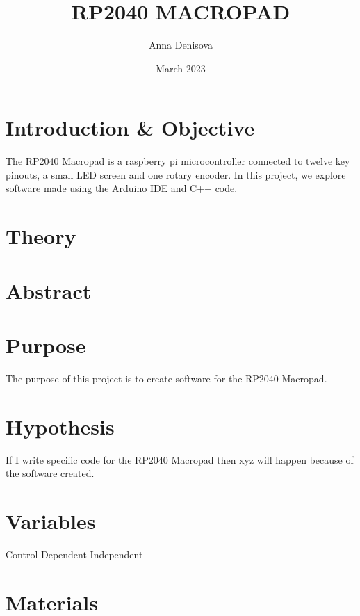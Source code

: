 \documentclass{article}
\title{RP2040 MACROPAD}
\author{Anna Denisova}
\date{March 2023}
\begin{document}
\maketitle
\tableofcontents

\newpage

\section{Introduction \& Objective}

The RP2040 Macropad is a raspberry pi microcontroller connected to twelve key pinouts, a small LED screen and one rotary encoder. In this project, we explore software made using the Arduino IDE and C++ code. 

\section{Theory}

\section{Abstract}

\section{Purpose}

The purpose of this project is to create software for the RP2040 Macropad.

\section{Hypothesis}

If I write specific code for the RP2040 Macropad then xyz will happen because of the software created.

\section{Variables}

Control
Dependent
Independent

\section{Materials}
\end{document}

